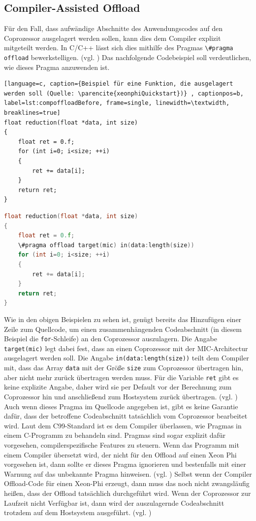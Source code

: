 \documentclass[../main.tex]{subfiles}
\begin{document}
\subsection{Compiler-Assisted Offload}
Für den Fall, dass aufwändige Abschnitte des Anwendungscodes auf den Coprozessor ausgelagert werden sollen, kann dies dem Compiler explizit mitgeteilt werden. In C/C++ lässt sich dies mithilfe des Pragmas \lstinline|\#pragma offload| bewerkstelligen. (vgl. \cite{xeonphiQuickstart}) Das nachfolgende Codebeispiel soll verdeutlichen, wie dieses Pragma anzuwenden ist. 
\begin{lstlisting}[language=c, caption={Beispiel für eine Funktion, die ausgelagert werden soll (Quelle: \parencite{xeonphiQuickstart})} , captionpos=b, label=lst:compoffloadBefore, frame=single, linewidth=\textwidth, breaklines=true]
float reduction(float *data, int size) 
{ 
	float ret = 0.f; 
	for (int i=0; i<size; ++i) 
	{
		ret += data[i]; 
	} 
	return ret; 
}
\end{lstlisting}
\begin{lstlisting}[language=c, caption={Beispielfunktion mit pragma zur Auslagerung(Quelle: \parencite{xeonphiQuickstart})}, captionpos=b, label=lst:compoffloadAfter, frame=single, linewidth=\textwidth, breaklines=true]
float reduction(float *data, int size) 
{ 
	float ret = 0.f; 
	\#pragma offload target(mic) in(data:length(size))
	for (int i=0; i<size; ++i) 
	{
		ret += data[i]; 
	} 
	return ret; 
}
\end{lstlisting}
Wie in den obigen Beispielen zu sehen ist, genügt bereits das Hinzufügen einer Zeile zum Quellcode, um einen zusammenhängenden Codeabschnitt (in diesem Beispiel die \lstinline|for|-Schleife) an den Coprozessor auszulagern. Die Angabe \lstinline|target(mic)| legt dabei fest, dass an einen Coprozessor mit der MIC-Architectur ausgelagert werden soll. Die Angabe \lstinline|in(data:length(size))| teilt dem Compiler mit, dass das Array \lstinline|data| mit der Größe \lstinline|size| zum Coprozessor übertragen hin, aber nicht mehr zurück übertragen werden muss. Für die Variable \lstinline|ret| gibt es keine explizite Angabe, daher wird sie per Default vor der Berechnung zum Coprozessor hin und anschließend zum Hostsystem zurück übertragen. (vgl. \cite{xeonphiQuickstart})
Auch wenn dieses Pragma im Quellcode angegeben ist, gibt es keine Garantie dafür, dass der betroffene Codeabschnitt tatsächlich vom Coprozessor bearbeitet wird. Laut dem C99-Standard ist es dem Compiler überlassen, wie Pragmas in einem C-Programm zu behandeln sind. Pragmas sind sogar explizit dafür vorgesehen, compilerspezifische Features zu steuern. Wenn das Programm mit einem Compiler übersetzt wird, der nicht für den Offload auf einen Xeon Phi vorgesehen ist, dann sollte er dieses Pragma ignorieren und bestenfalls mit einer Warnung auf das unbekannte Pragma hinweisen. (vgl. \cite{gccDokuPragmas}) Selbst wenn der Compiler Offload-Code für einen Xeon-Phi erzeugt, dann muss das noch nicht zwangsläufig heißen, dass der Offload tatsächlich durchgeführt wird. Wenn der Coprozessor zur Laufzeit nicht Verfügbar ist, dann wird der auszulagernde Codeabschnitt trotzdem auf dem Hostsystem ausgeführt. (vgl. \cite{xeonphiQuickstart})
\end{document}
